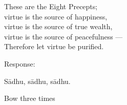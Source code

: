 \begin{english}
  These are the Eight Precepts;\\
  virtue is the source of happiness,\\
  virtue is the source of true wealth,\\
  virtue is the source of peacefulness ---\\
  Therefore let virtue be purified.
\end{english}

\begin{instruction}
  Response:
\end{instruction}

Sādhu, sādhu, sādhu.

\begin{instruction}
  Bow three times
\end{instruction}

